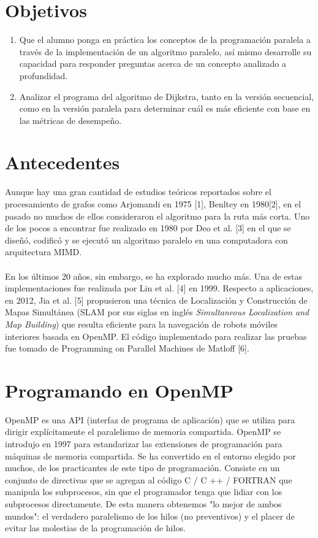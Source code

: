 \documentclass[11pt]{article}
\begin{document}
\section{Objetivos}
\begin{enumerate}
\item Que el alumno ponga en práctica los conceptos de la programación paralela a través de la implementación de un algoritmo paralelo, así mismo desarrolle su capacidad para responder preguntas acerca de un concepto analizado a profundidad.
\item Analizar el programa del algoritmo de Dijkstra, tanto en la versión secuencial, como en la versión paralela para determinar cuál es más eficiente con base en las métricas de desempeño.

\end{enumerate}

\section{Antecedentes}
Aunque hay una gran cantidad de estudios teóricos reportados sobre el procesamiento de grafos como Arjomandi en 1975 [1], Benltey en 1980[2], en el pasado no muchos de ellos consideraron el algoritmo para la ruta más corta. Uno de los pocos a encontrar fue realizado en 1980 por Deo et al. [3] en el que se diseñó, codificó y se ejecutó un algoritmo paralelo en una computadora con arquitectura MIMD. 

\paragraph{}
En los últimos 20 años, sin embargo, se ha explorado mucho más. Una de estas implementaciones fue realizada por Lin et al. [4] en 1999. Respecto a aplicaciones, en 2012, Jia et al. [5] propusieron una técnica de Localización y Construcción de Mapas Simultánea (SLAM por sus siglas en inglés \textit {Simultaneous Localization and Map Building}) que resulta eficiente para la navegación de robots móviles interiores basada en OpenMP. 
El código implementado para realizar las pruebas fue tomado de Programming on Parallel Machines de Matloff [6].


\section{Programando en OpenMP}
OpenMP es una API (interfaz de programa de aplicación) que se utiliza para dirigir explícitamente el paralelismo de memoria compartida. OpenMP se introdujo en 1997 para estandarizar las extensiones de programación para máquinas de memoria compartida. Se ha convertido en el entorno elegido por muchos, de los practicantes de este tipo de programación. Consiste en un conjunto de directivas que se agregan al código C / C ++ / FORTRAN que manipula los subprocesos, sin que el programador tenga que lidiar con los subprocesos directamente. De esta manera obtenemos "lo mejor de ambos mundos": el verdadero paralelismo de los hilos (no preventivos) y el placer de evitar las molestias de la programación de hilos. 
\end{document}
